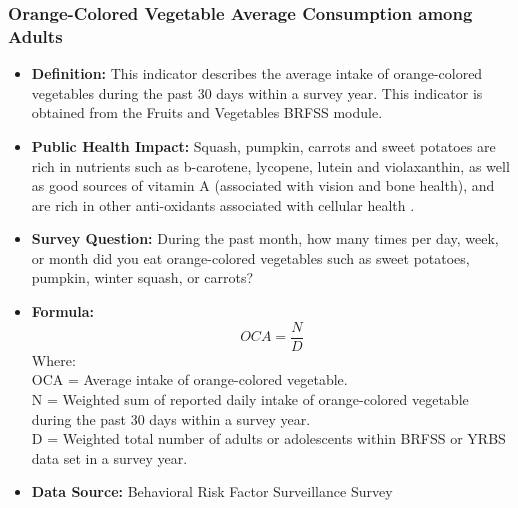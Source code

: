 \documentclass[12pt,letterpaper]{report}
\begin{document}
		\subsubsection{Orange-Colored Vegetable Average Consumption among Adults} 
	\begin{itemize}
		\item \textbf{Definition:} This indicator describes the average intake of orange-colored vegetables during the past 30 days within a survey year. This indicator is obtained from the Fruits and Vegetables BRFSS module. 
		\item \textbf{Public Health Impact:} Squash, pumpkin, carrots and sweet potatoes are rich in nutrients such as b-carotene, lycopene, lutein and violaxanthin, as well as good sources of vitamin A (associated with vision and bone health), and are rich in other anti-oxidants associated with cellular health \cite{dutta2004structure}. 
		\item \textbf{Survey Question:} During the past month, how many times per day, week, or month did you eat orange-colored vegetables such as sweet potatoes, pumpkin, winter squash, or carrots?
		\item \textbf{Formula:} 
			\begin{equation}
				OCA = \frac{N}{D}
			\end{equation}
Where: \\
			OCA = Average intake of orange-colored vegetable.\\
			
			N = Weighted sum of reported daily intake of orange-colored vegetable during the past 30 days within a survey year.\\
			
			D = Weighted total number of adults or adolescents within BRFSS or YRBS data set in a survey year.\\
			
		\item \textbf{Data Source:} Behavioral Risk Factor Surveillance Survey
	\end{itemize}

\end{document}

